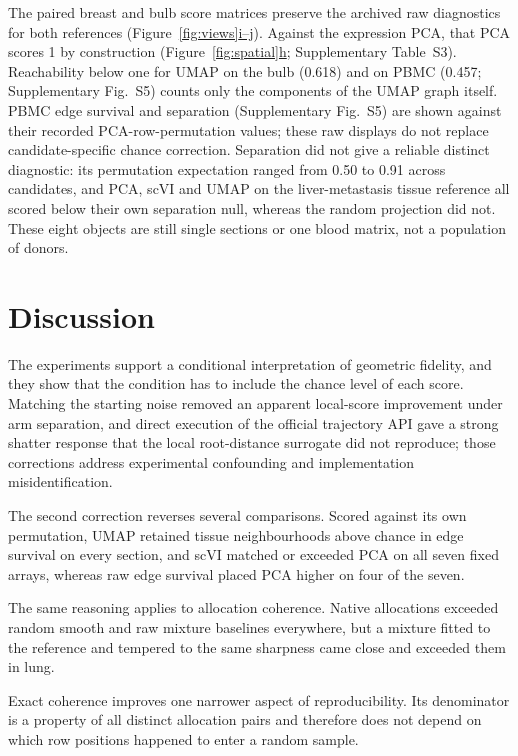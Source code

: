 \documentclass[11pt]{article}
\newcommand{\figpanel}[2]{Figure~\hyperref[#1]{\ref*{#1}#2}}
\begin{document}
\FloatBarrier

The paired breast and bulb score matrices preserve the archived raw diagnostics for both references (\figpanel{fig:views}{i--j}). Against the expression PCA, that PCA scores 1 by construction (\figpanel{fig:spatial}{h}; Supplementary Table~S3). Reachability below one for UMAP on the bulb (0.618) and on PBMC (0.457; Supplementary Fig.~S5) counts only the components of the UMAP graph itself. PBMC edge survival and separation (Supplementary Fig.~S5) are shown against their recorded PCA-row-permutation values; these raw displays do not replace candidate-specific chance correction. Separation did not give a reliable distinct diagnostic: its permutation expectation ranged from 0.50 to 0.91 across candidates, and PCA, scVI and UMAP on the liver-metastasis tissue reference all scored below their own separation null, whereas the random projection did not. These eight objects are still single sections or one blood matrix, not a population of donors.



\FloatBarrier

\section{Discussion}
The experiments support a conditional interpretation of geometric fidelity, and they show that the condition has to include the chance level of each score. Matching the starting noise removed an apparent local-score improvement under arm separation, and direct execution of the official trajectory API gave a strong shatter response that the local root-distance surrogate did not reproduce; those corrections address experimental confounding and implementation misidentification.

The second correction reverses several comparisons. Scored against its own permutation, UMAP retained tissue neighbourhoods above chance in edge survival on every section, and scVI matched or exceeded PCA on all seven fixed arrays, whereas raw edge survival placed PCA higher on four of the seven.

The same reasoning applies to allocation coherence. Native allocations exceeded random smooth and raw mixture baselines everywhere, but a mixture fitted to the reference and tempered to the same sharpness came close and exceeded them in lung.

Exact coherence improves one narrower aspect of reproducibility. Its denominator is a property of all distinct allocation pairs and therefore does not depend on which row positions happened to enter a random sample.
\end{document}

